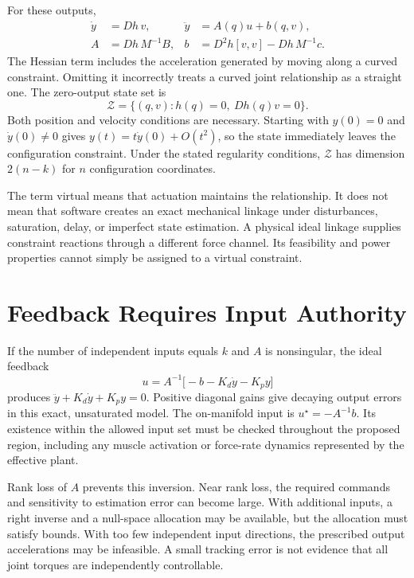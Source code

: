\documentclass[12pt, openany]{book}
\theoremstyle{plain}
\begin{document}
For these outputs,
\begin{equation}
\begin{aligned}
\dot y&=Dh\,v,&\ddot y&=A(q)u+b(q,v),\\
A&=Dh\,M^{-1}B,&b&=D^2h[v,v]-Dh\,M^{-1}c .
\end{aligned}
\end{equation}
The Hessian term includes the acceleration generated by moving along a curved constraint. Omitting it incorrectly treats a curved joint relationship as a straight one. The zero-output state set is
\begin{equation}
\mathcal Z=\{(q,v):h(q)=0,\ Dh(q)v=0\}.
\end{equation}
Both position and velocity conditions are necessary. Starting with $y(0)=0$ and $\dot y(0)\ne0$ gives $y(t)=t\dot y(0)+O(t^2)$, so the state immediately leaves the configuration constraint. Under the stated regularity conditions, $\mathcal Z$ has dimension $2(n-k)$ for $n$ configuration coordinates.

The term virtual means that actuation maintains the relationship. It does not mean that software creates an exact mechanical linkage under disturbances, saturation, delay, or imperfect state estimation. A physical ideal linkage supplies constraint reactions through a different force channel. Its feasibility and power properties cannot simply be assigned to a virtual constraint.

\section{Feedback Requires Input Authority}

If the number of independent inputs equals $k$ and $A$ is nonsingular, the ideal feedback
\begin{equation}
u=A^{-1}\bigl[-b-K_d\dot y-K_p y\bigr]
\end{equation}
produces $\ddot y+K_d\dot y+K_p y=0$. Positive diagonal gains give decaying output errors in this exact, unsaturated model. The on-manifold input is $u^\star=-A^{-1}b$. Its existence within the allowed input set must be checked throughout the proposed region, including any muscle activation or force-rate dynamics represented by the effective plant.

Rank loss of $A$ prevents this inversion. Near rank loss, the required commands and sensitivity to estimation error can become large. With additional inputs, a right inverse and a null-space allocation may be available, but the allocation must satisfy bounds. With too few independent input directions, the prescribed output accelerations may be infeasible. A small tracking error is not evidence that all joint torques are independently controllable.
\end{document}
